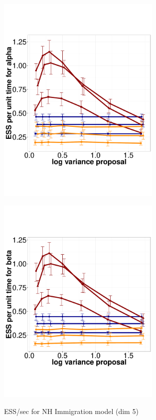   \begin{figure}%
  \centering
  \begin{minipage}[!hp]{0.45\linewidth}
  \centering
    \includegraphics [width=0.70\textwidth, angle=0]{figs/pc_5_alpha.pdf}
      \end{minipage}
  \begin{minipage}[!hp]{0.45\linewidth}
  \centering
    \includegraphics [width=0.70\textwidth, angle=0]{figs/pc_5_beta.pdf}
    \vspace{-0 in}
     \label{fig:ESS_pc_5}
  \end{minipage}
    \caption{ESS/sec for NH Immigration model (dim 5)}
  \end{figure}

